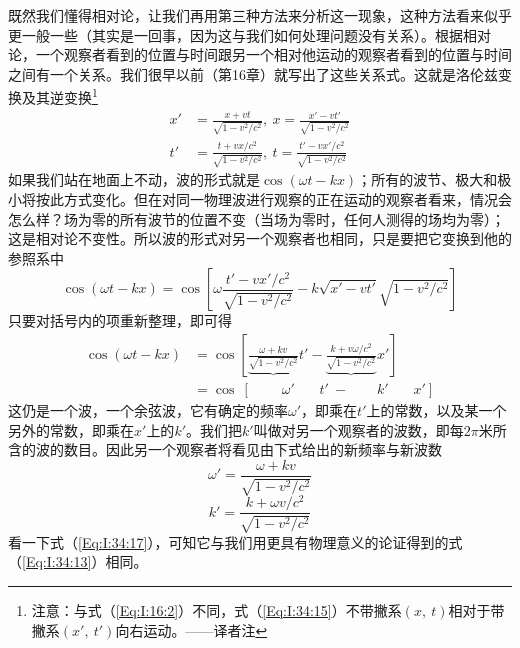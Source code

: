 既然我们懂得相对论，让我们再用第三种方法来分析这一现象，这种方法看来似乎更一般一些（其实是一回事，因为这与我们如何处理问题没有关系）。根据相对论，一个观察者看到的位置与时间跟另一个相对他运动的观察者看到的位置与时间之间有一个关系。我们很早以前（第16章）就写出了这些关系式。这就是洛伦兹变换及其逆变换\footnote{注意：与式（\ref{Eq:I:16:2}）不同，式（\ref{Eq:I:34:15}）不带撇系$(x,~t)$相对于带撇系$(x',~t')$向右运动。——译者注}
\begin{equation}
    \label{Eq:I:34:15}
    \begin{aligned}
        x' &= \frac{x+vt}{\sqrt{1-v^2/c^2}},~x = \frac{x'-vt'}{\sqrt{1-v^2/c^2}} \\
        t' &= \frac{t+vx/c^2}{\sqrt{1-v^2/c^2}},~t = \frac{t'-vx'/c^2}{\sqrt{1-v^2/c^2}} 
    \end{aligned}
\end{equation}
如果我们站在地面上不动，波的形式就是$\cos(\omega t-kx)$；所有的波节、极大和极小将按此方式变化。但在对同一物理波进行观察的正在运动的观察者看来，情况会怎么样？场为零的所有波节的位置不变（当场为零时，任何人测得的场均为零）；这是相对论不变性。所以波的形式对另一个观察者也相同，只是要把它变换到他的参照系中
\begin{equation*}
    \cos(\omega t - kx) = \cos \left [ \omega\frac{t'-vx'/c^2}{\sqrt{1-v^2/c^2}} - k\sqrt{x'-vt'}{\sqrt{1-v^2/c^2}} \right ]
\end{equation*}
只要对括号内的项重新整理，即可得
\begin{equation}
    \label{Eq:I:34:16}
    \begin{aligned}
        \cos(\omega t - kx) &= \cos \left [ \underbrace{\frac{\omega + kv}{\sqrt{1-v^2/c^2}}}t' - \underbrace{\frac{k + v\omega /c^2}{\sqrt{1-v^2/c^2}}}x' \right ] \\
        &=\cos~[~~~~~~~~~~\omega'~~~~~~~~ t' ~-~~~~~~~~~ k' ~~~~~~~~x']
    \end{aligned}
\end{equation}
这仍是一个波，一个余弦波，它有确定的频率$\omega'$，即乘在$t'$上的常数，以及某一个另外的常数，即乘在$x'$上的$k'$。我们把$k'$叫做对另一个观察者的波数，即每$2\pi$米所含的波的数目。因此另一个观察者将看见由下式给出的新频率与新波数
\begin{equation}
    \label{Eq:I:34:17}
    \omega' = \frac{\omega + kv}{\sqrt{1-v^2/c^2}}
\end{equation}
\begin{equation}
    \label{Eq:I:34:18}
    k' = \frac{k + \omega v/c^2}{\sqrt{1-v^2/c^2}}
\end{equation}
看一下式（\ref{Eq:I:34:17}），可知它与我们用更具有物理意义的论证得到的式（\ref{Eq:I:34:13}）相同。

